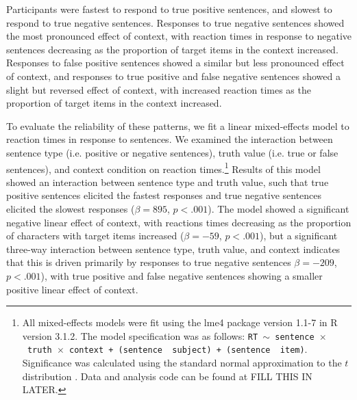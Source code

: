 \documentclass[man, noapacite]{apa2}
\begin{document}
Participants were fastest to respond to true positive sentences, and slowest to respond to true negative sentences.  Responses to true negative sentences showed the most pronounced effect of context, with reaction times in response to negative sentences decreasing as the proportion of target items in the context increased.  Responses to false positive sentences showed a similar but less pronounced effect of context, and responses to true positive and false negative sentences showed a slight but reversed effect of context, with increased reaction times as the proportion of target items in the context increased.  

To evaluate the reliability of these patterns, we fit a linear mixed-effects model to reaction times in response to sentences.  We examined the interaction between sentence type (i.e. positive or negative sentences), truth value (i.e. true or false sentences), and context condition on reaction times.\footnote{All mixed-effects models were fit using the lme4 package version 1.1-7 in R version 3.1.2.  The model specification was as follows: \texttt{RT $\sim$ sentence~$\times$~truth~$\times$~context + (sentence~\textbar~subject) +  (sentence~\textbar~item)}.  Significance was calculated using the standard normal approximation to the $t$ distribution \cite{barr2013}. Data and analysis code can be found at FILL THIS IN LATER.}  Results of this model showed an interaction between sentence type and truth value, such that true positive sentences elicited the fastest responses and true negative sentences elicited the slowest responses ($\beta= 895$, $p< .001$).  The model showed a significant negative linear effect of context, with reactions times decreasing as the proportion of characters with target items increased ($\beta= -59$, $p< .001$), but a significant three-way interaction between sentence type, truth value, and context indicates that this is driven primarily by responses to true negative sentences $\beta= -209$, $p< .001$), with true positive and false negative sentences showing a smaller positive linear effect of context.  
\end{document}
